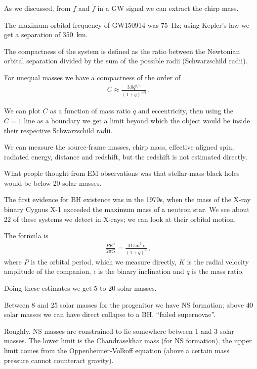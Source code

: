 \documentclass[main.tex]{subfiles}
\begin{document}

As we discussed, from \(f\) and \(\dot{f}\) in a GW signal 
we can extract the chirp mass. 

The maximum orbital frequency of GW150914 was \SI{75}{Hz}; 
using Kepler's law we get a separation of \SI{350}{km}. 

The compactness of the system is defined as the ratio between the 
Newtonian orbital separation divided by the sum of the possible radii (Schwarzschild radii).

For unequal masses we have a compactness of the order of 
%
\begin{align}
C \approx \frac{3.0 q^{2/5}}{(1 + q)^{4/5}}
\,.
\end{align}

We can plot \(C\) as a function of mass ratio \(q\) and eccentricity, then using
the \(C = 1\) line as a boundary we get a limit beyond which the object would be inside 
their respective Schwarzschild radii. 


We can measure the source-frame masses, chirp mass, effective aligned spin,
radiated energy, distance and redshift, but the redshift is not estimated directly. 

What people thought from EM observations was that stellar-mass black holes would be below 
20 solar masses. 

The first evidence for BH existence was in the 1970s, when the mass of the X-ray binary 
Cygnus X-1 exceeded the maximum mass of a neutron star. 
We see about 22 of these systems we detect in X-rays; we can look at their orbital motion.

The formula is 
%
\begin{align}
\frac{PK^3}{2 \pi G} = \frac{M \sin^3 \iota }{(1 + q)^2}
\,,
\end{align}
%
where \(P\) is the orbital period, which we measure directly, 
\(K\) is the radial velocity amplitude of the companion, 
\(\iota \) is the binary inclination and \(q\) is the mass ratio. 

Doing these estimates we get 5 to 20 solar masses. 

Between 8 and 25 solar masses for the progenitor we have NS formation;
above 40 solar masses we can have direct collapse to a BH, ``failed supernovae''. 

Roughly, NS masses are constrained to lie somewhere between 1 and 3 solar masses. 
The lower limit is the Chandrasekhar mass (for NS formation), 
the upper limit comes from the Oppenheimer-Volkoff equation 
(above a certain mass pressure cannot counteract gravity).
\end{document}
